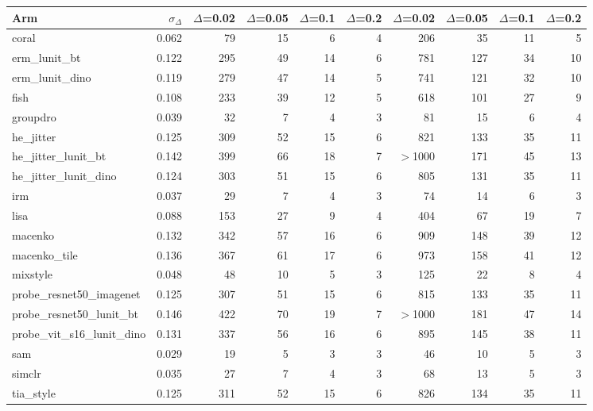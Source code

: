 \begin{tabular}{lrrrrrrrrr}
\toprule
Arm & $\sigma_\Delta$ & $\Delta$=0.02 & $\Delta$=0.05 & $\Delta$=0.1 & $\Delta$=0.2 & $\Delta$=0.02 & $\Delta$=0.05 & $\Delta$=0.1 & $\Delta$=0.2 \\
\midrule
coral & 0.062 & 79 & 15 & 6 & 4 & 206 & 35 & 11 & 5 \\
erm\_lunit\_bt & 0.122 & 295 & 49 & 14 & 6 & 781 & 127 & 34 & 10 \\
erm\_lunit\_dino & 0.119 & 279 & 47 & 14 & 5 & 741 & 121 & 32 & 10 \\
fish & 0.108 & 233 & 39 & 12 & 5 & 618 & 101 & 27 & 9 \\
groupdro & 0.039 & 32 & 7 & 4 & 3 & 81 & 15 & 6 & 4 \\
he\_jitter & 0.125 & 309 & 52 & 15 & 6 & 821 & 133 & 35 & 11 \\
he\_jitter\_lunit\_bt & 0.142 & 399 & 66 & 18 & 7 & $>$1000 & 171 & 45 & 13 \\
he\_jitter\_lunit\_dino & 0.124 & 303 & 51 & 15 & 6 & 805 & 131 & 35 & 11 \\
irm & 0.037 & 29 & 7 & 4 & 3 & 74 & 14 & 6 & 3 \\
lisa & 0.088 & 153 & 27 & 9 & 4 & 404 & 67 & 19 & 7 \\
macenko & 0.132 & 342 & 57 & 16 & 6 & 909 & 148 & 39 & 12 \\
macenko\_tile & 0.136 & 367 & 61 & 17 & 6 & 973 & 158 & 41 & 12 \\
mixstyle & 0.048 & 48 & 10 & 5 & 3 & 125 & 22 & 8 & 4 \\
probe\_resnet50\_imagenet & 0.125 & 307 & 51 & 15 & 6 & 815 & 133 & 35 & 11 \\
probe\_resnet50\_lunit\_bt & 0.146 & 422 & 70 & 19 & 7 & $>$1000 & 181 & 47 & 14 \\
probe\_vit\_s16\_lunit\_dino & 0.131 & 337 & 56 & 16 & 6 & 895 & 145 & 38 & 11 \\
sam & 0.029 & 19 & 5 & 3 & 3 & 46 & 10 & 5 & 3 \\
simclr & 0.035 & 27 & 7 & 4 & 3 & 68 & 13 & 5 & 3 \\
tia\_style & 0.125 & 311 & 52 & 15 & 6 & 826 & 134 & 35 & 11 \\
\bottomrule
\end{tabular}
